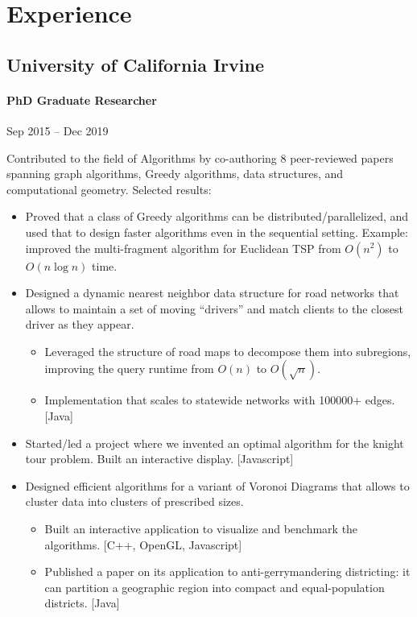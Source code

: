 \documentclass[letterpaper,10pt,oneside]{article}
\begin{document}
\section*{Experience}
\subsection*{University of California Irvine}
\vspace{-3px}
\paragraph*{PhD Graduate Researcher} \hfill Sep 2015 -- Dec 2019

\vspace{2px}
\noindent Contributed to the field of Algorithms by co-authoring 8 peer-reviewed papers spanning graph algorithms, Greedy algorithms, data structures, and computational geometry. Selected results:
\begin{itemize}[leftmargin=15px]
	\item Proved that a class of Greedy algorithms can be distributed/parallelized, and used that to design faster algorithms even in the sequential setting. Example: improved the multi-fragment algorithm for Euclidean TSP from $O(n^2)$ to $O(n\log n)$ time.
	\item Designed a dynamic nearest neighbor data structure for road networks that allows to maintain a set of moving  ``drivers'' and match clients to the closest driver as they appear.
	\begin{itemize}[leftmargin=15px,topsep=0px]
		\item Leveraged the structure of road maps to decompose them into subregions, improving the query runtime from $O(n)$ to $O(\sqrt{n})$.
		\item Implementation that scales to statewide networks with 100000+ edges. [Java]   
	\end{itemize}
	\item Started/led a project where we invented an optimal algorithm for the knight tour problem. Built an interactive display. [Javascript]
	\item Designed efficient algorithms for a variant of Voronoi Diagrams that allows to cluster data into clusters of prescribed sizes.
	\begin{itemize}[leftmargin=15px,topsep=0px]
		\item Built an interactive application to visualize and benchmark the algorithms. [C++, OpenGL, Javascript]
		\item Published a paper on its application to anti-gerrymandering districting: it can partition a geographic region into compact and equal-population districts. [Java]
	\end{itemize}
\end{itemize}
\end{document}
